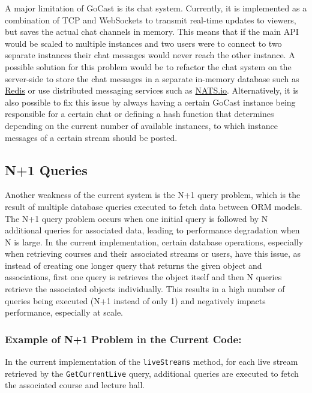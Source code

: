 A major limitation of GoCast is its chat system. Currently, it is implemented as a combination of TCP and WebSockets to transmit real-time updates to viewers, but saves the actual chat channels in memory. This means that if the main API would be scaled to multiple instances and two users were to connect to two separate instances their chat messages would never reach the other instance. A possible solution for this problem would be to refactor the chat system on the server-side to store the chat messages in a separate in-memory database such as \href{https://redis.io/}{Redis} or use distributed messaging services such as \href{https://github.com/nats-io/nats-server}{NATS.io}. Alternatively, it is also possible to fix this issue by always having a certain GoCast instance being responsible for a certain chat or defining a hash function that determines depending on the current number of available instances, to which instance messages of a certain stream should be posted. 

\subsection{N+1 Queries}

Another weakness of the current system is the N+1 query problem, which is the result of multiple database queries executed to fetch data between \ac{ORM} models. The N+1 query problem occurs when one initial query is followed by N additional queries for associated data, leading to performance degradation when N is large. In the current implementation, certain database operations, especially when retrieving courses and their associated streams or users, have this issue, as instead of creating one longer query that returns the given object and associations, first one query is retrieves the object itself and then N queries retrieve the associated objects individually. This results in a high number of queries being executed (N+1 instead of only 1) and negatively impacts performance, especially at scale.

\subsubsection{Example of N+1 Problem in the Current Code:}

In the current implementation of the \texttt{liveStreams} method, for each live stream retrieved by the \texttt{GetCurrentLive} query, additional queries are executed to fetch the associated course and lecture hall.

